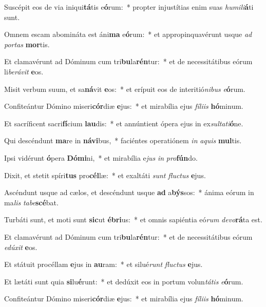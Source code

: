 \item Suscépit eos de via iniqui\textbf{tá}tis e\textbf{ó}rum:~* propter injustítias enim suas \textit{hu}\textit{mi}\textit{li}\textbf{á}ti sunt.
\item Omnem escam abomináta est áni\textbf{ma} e\textbf{ó}rum:~* et appropinquavérunt usque \textit{ad} \textit{por}\textit{tas} \textbf{mor}tis.
\item Et clamavérunt ad Dóminum cum tri\textbf{bu}la\textbf{rén}tur:~* et de necessitátibus eórum li\textit{be}\textit{rá}\textit{vit} \textbf{e}os.
\item Misit verbum suum, et sa\textbf{ná}vit \textbf{e}os:~* et erípuit eos de interitió\textit{ni}\textit{bus} \textit{e}\textbf{ó}rum.
\item Confiteántur Dómino miseri\textbf{cór}diæ \textbf{e}jus:~* et mirabília ejus \textit{fí}\textit{li}\textit{is} \textbf{hó}minum.
\item Et sacríficent sacri\textbf{fí}cium \textbf{lau}dis:~* et annúntient ópera ejus in ex\textit{sul}\textit{ta}\textit{ti}\textbf{ó}ne.
\item Qui descéndunt \textbf{ma}re in \textbf{ná}\textbf{vi}bus,~* faciéntes operatiónem \textit{in} \textit{a}\textit{quis} \textbf{mul}tis.
\item Ipsi vidérunt \textbf{ó}pera \textbf{Dó}\textbf{mi}ni,~* et mirabília e\textit{jus} \textit{in} \textit{pro}\textbf{fún}do.
\item Dixit, et stetit spíri\textbf{tus} pro\textbf{cél}læ:~* et exaltáti \textit{sunt} \textit{fluc}\textit{tus} \textbf{e}jus.
\item Ascéndunt usque ad cælos, et descéndunt usque \textbf{ad} a\textbf{býs}sos:~* ánima eórum in ma\textit{lis} \textit{ta}\textit{be}\textbf{scé}bat.
\item Turbáti sunt, et moti sunt \textbf{sic}ut \textbf{é}\textbf{bri}us:~* et omnis sapiéntia eó\textit{rum} \textit{de}\textit{vo}\textbf{rá}ta est.
\item Et clamavérunt ad Dóminum cum tri\textbf{bu}la\textbf{rén}tur:~* et de necessitátibus eórum \textit{e}\textit{dú}\textit{xit} \textbf{e}os.
\item Et státuit procéllam \textbf{e}jus in \textbf{au}ram:~* et silué\textit{runt} \textit{fluc}\textit{tus} \textbf{e}jus.
\item Et lætáti sunt quia \textbf{si}lu\textbf{é}runt:~* et dedúxit eos in portum volun\textit{tá}\textit{tis} \textit{e}\textbf{ó}rum.
\item Confiteántur Dómino miseri\textbf{cór}diæ \textbf{e}jus:~* et mirabília ejus \textit{fí}\textit{li}\textit{is} \textbf{hó}minum.
